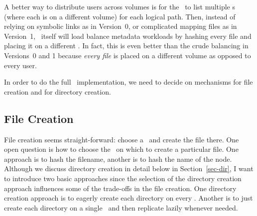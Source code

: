 \documentclass[10pt]{article}
\begin{document}
A better way to distribute users across volumes is for the \plfsrc\ to list
multiple {\store}s (where each is on a different volume) for each logical path.
Then, instead of relying on symbolic links as in Version~0, or complicated
mapping files as in Version~1, \plfs\ itself will load balance metadata
workloads by hashing every file and placing it on a different \store.  In fact,
this is even better than the crude balancing in Versions~0 and 1 because {\em
every file} is placed on a different volume as opposed to every user. 

In order to do the full \mds\ implementation, we need to decide on mechanisms
for file creation and for directory creation.  

\subsection{File Creation}

File creation seems straight-forward: choose a \store\ and create the file
there.  One open question is how to choose the \store\ on which to create a
particular file.  One approach is to hash the filename, another is to hash the
name of the node.  Although we discuss directory creation in detail below in
Section~\ref{sec-dir}, I want to introduce two basic approaches since the
selection of the directory creation approach influences some of the trade-offs
in the file creation.  One directory creation approach is to eagerly create
each directory on every \store.  Another is to just create each directory on a
single \store\ and then replicate lazily whenever needed.

\end{document}
